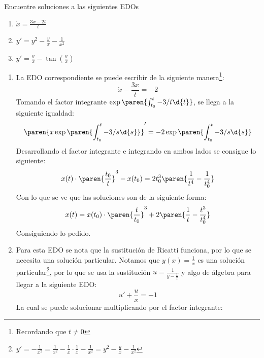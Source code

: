 \documentclass{homework}
\begin{document}
\begin{prob}
    Encuentre soluciones a las siguientes EDOs
    \begin{enumerate}
        \item \(\dot{x}=\frac{3x-2t}{t}\)
        \item \(y'=y^2-\frac{y}{x}-\frac1{x^2}\)
        \item \(y'=\frac{y}{x}-\tan({\frac{y}{x}})\)
    \end{enumerate}
\end{prob}

\begin{sol}
    \begin{enumerate}
        \item La EDO correspondiente se puede escribir de la siguiente manera\footnote{Recordando que \(t\neq0\)}:
        \begin{equation*}
            \dot{x}-\frac{3x}t=-2
        \end{equation*}
        Tomando el factor integrante \(\exp\paren{\int_{t_0}^t-3/t\d{t}}\), se llega a la siguiente igualdad:
        \begin{equation*}
            \paren{x\exp\paren{\int_{t_0}^t-3/s\d{s}}}'=-2\exp\paren{\int_{t_0}^t-3/s\d{s}}
        \end{equation*}
        Desarrollando el factor integrante e integrando en ambos lados se consigue lo siguiente:
        \begin{equation*}
            x(t)\cdot\paren{\frac{t_0}{t}}^3-x(t_0)=2t_0^3\paren{\frac1{t^4}-\frac1{t_0^4}}
        \end{equation*}
        Con lo que se ve que las soluciones son de la siguiente forma:
        \begin{equation*}
            x(t)=x(t_0)\cdot\paren{\frac{t}{t_0}}^3+2\paren{\frac1t-\frac{t^3}{t_0^4}}
        \end{equation*}
        Consiguiendo lo pedido.
        \item Para esta EDO se nota que la sustitución de Ricatti funciona, por lo que se necesita una solución particular. Notamos que \(y(x)=\frac1x\) es una solución particular\footnote{\(y'=-\frac1{x^2}=\frac1{x^2}-\frac1x\cdot\frac1x-\frac1{x^2}=y^2-\frac{y}x-\frac1{x^2}\)}, por lo que se usa la sustitución \(u=\frac1{y-\frac1x}\) y algo de álgebra para llegar a la siguiente EDO:
        \begin{equation*}
            u'+\frac{u}x=-1
        \end{equation*}
        La cual se puede solucionar multiplicando por el factor integrante:

\end{enumerate}
\end{sol}
\end{document}
